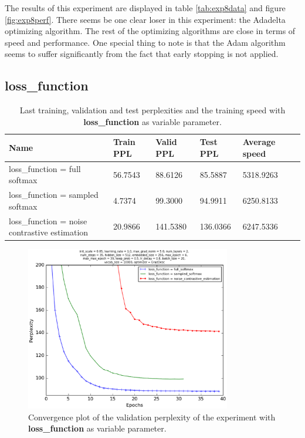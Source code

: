 \documentclass[10pt,a4paper,titlepage]{article}
\begin{document}
The results of this experiment are displayed in table \ref{tab:exp8data} and figure \ref{fig:exp8perf}. There seems be one clear loser in this experiment: the Adadelta optimizing algorithm. The rest of the optimizing algorithms are close in terms of speed and performance. One special thing to note is that the Adam algorithm seems to suffer significantly from the fact that early stopping is not applied.

\newpage

\subsection{loss\_function}

\begin{table}[H]
\centering
\caption{Last training, validation and test perplexities and the training speed with \textbf{loss\_function} as variable parameter.}
\label{tab:exp9data}
\begin{tabular}{|l|l|l|l|l|l|}
\hline
{\small Name} & {\small Train PPL} & {\small Valid PPL} & {\small Test PPL} & {\small Average speed}\\ \hline
{\small loss\_function = full softmax }                 & 56.7543    & 88.6126    & 85.5887    & 5318.9263  \\ \hline
{\small loss\_function = sampled softmax }              & 4.7374     & 99.3000    & 94.9911    & 6250.8133  \\ \hline
{\small loss\_function = noise contrastive estimation}  & 20.9866    & 141.5380   & 136.0366   & 6247.5336  \\ \hline
\end{tabular}
\end{table}

\begin{figure}[H]
	\begin{center}
		\includegraphics[width=0.80\textwidth]{Figures/lossperf.eps}
		\caption{Convergence plot of the validation perplexity of the experiment with \textbf{loss\_function} as variable parameter. }
		\label{fig:exp9perf}
	\end{center}	
\end{figure}
\end{document}
